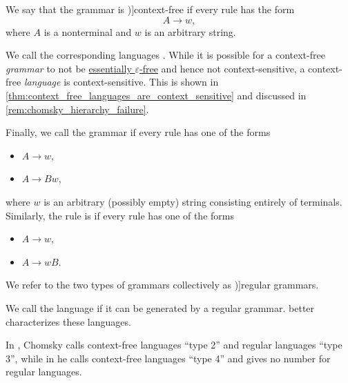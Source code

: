 \begin{definition}
\begin{thmenum}
     We say that the grammar is \term[ru=безконтекстная / контекстно-свободная (грамматика) (\cite[29]{Гладкий1973ГрамматикиИЯзыки})]{context-free} if every rule has the form
    \begin{equation*}
      A \to w,
    \end{equation*}
    where \( A \) is a nonterminal and \( w \) is an arbitrary string.

    We call the corresponding languages . While it is possible for a context-free \emph{grammar} to not be \hyperref[def:epsilon_free_grammar]{essentially \( \varepsilon \)-free} and hence not context-sensitive, a context-free \emph{language} is context-sensitive. This is shown in \cref{thm:context_free_languages_are_context_sensitive} and discussed in \cref{rem:chomsky_hierarchy_failure}.

     Finally, we call the grammar  if every rule has one of the forms
    \begin{itemize}
      \item \( A \to w \),
      \item \( A \to B w \),
    \end{itemize}
    where \( w \) is an arbitrary (possibly empty) string consisting entirely of terminals. Similarly, the rule is  if every rule has one of the forms
    \begin{itemize}
      \item \( A \to w \),
      \item \( A \to w B \).
    \end{itemize}

    We refer to the two types of grammars collectively as \term[ru=автоматная (грамматика) (\cite[29]{Гладкий1973ГрамматикиИЯзыки})]{regular grammars}.

    We call the language  if it can be generated by a regular grammar.  better characterizes these languages.
  \end{thmenum}
\end{definition}
\begin{comments}
  \item In \cite[142]{Chomsky1959Grammars}, Chomsky calls context-free languages \enquote{type 2} and regular languages \enquote{type 3}, while in \cite[366]{Chomsky1963Grammars} he calls context-free languages \enquote{type 4} and gives no number for regular languages.
\end{comments}

